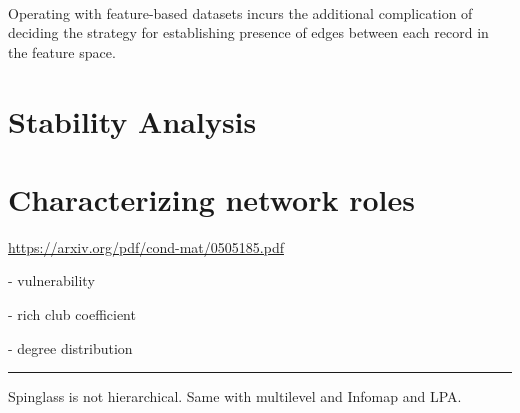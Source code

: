 ~\cite{luenberger2008linear}

Operating with feature-based datasets incurs the additional complication of deciding the strategy for establishing presence of edges between each record in the feature space.

\section{Stability Analysis}\label{sec:Stability Analysis}

\section{Characterizing network roles}

\url{https://arxiv.org/pdf/cond-mat/0505185.pdf}

- vulnerability

- rich club coefficient

- degree distribution

\hrule

Spinglass is not hierarchical. Same with multilevel and Infomap and LPA.